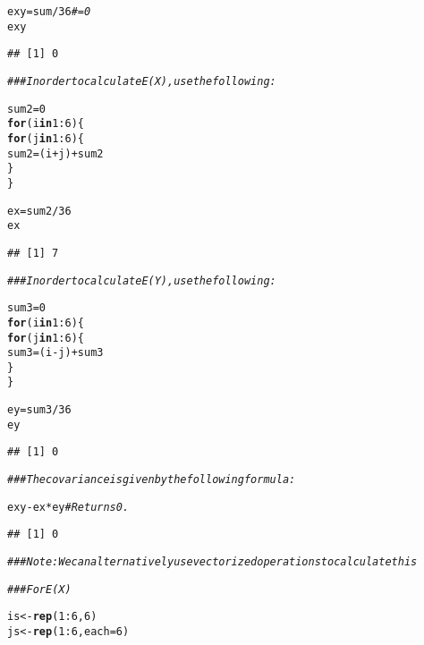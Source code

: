 \documentclass[12pt,letter]{article}\usepackage[]{graphicx}\usepackage[]{color}
\makeatletter
\newcommand{\hlnum}[1]{\textcolor[rgb]{0.686,0.059,0.569}{#1}}%
\newcommand{\hlcom}[1]{\textcolor[rgb]{0.678,0.584,0.686}{\textit{#1}}}%
\newcommand{\hlopt}[1]{\textcolor[rgb]{0,0,0}{#1}}%
\newcommand{\hlstd}[1]{\textcolor[rgb]{0.345,0.345,0.345}{#1}}%
\newcommand{\hlkwa}[1]{\textcolor[rgb]{0.161,0.373,0.58}{\textbf{#1}}}%
\newcommand{\hlkwb}[1]{\textcolor[rgb]{0.69,0.353,0.396}{#1}}%
\newcommand{\hlkwc}[1]{\textcolor[rgb]{0.333,0.667,0.333}{#1}}%
\newcommand{\hlkwd}[1]{\textcolor[rgb]{0.737,0.353,0.396}{\textbf{#1}}}%
\newenvironment{kframe}{%
 \def\at@end@of@kframe{}%
 \ifinner\ifhmode%
  \def\at@end@of@kframe{\end{minipage}}%
  \begin{minipage}{\columnwidth}%
 \fi\fi%
 \def\FrameCommand##1{\hskip\@totalleftmargin \hskip-\fboxsep
 \colorbox{shadecolor}{##1}\hskip-\fboxsep
     \hskip-\linewidth \hskip-\@totalleftmargin \hskip\columnwidth}%
 \MakeFramed {\advance\hsize-\width
   \@totalleftmargin\z@ \linewidth\hsize
   \@setminipage}}%
 {\par\unskip\endMakeFramed%
 \at@end@of@kframe}
\newenvironment{knitrout}{}{} %
\makeatother
\begin{document}
\begin{knitrout}
\color{fgcolor}\begin{kframe}
\begin{alltt}
\hlstd{exy} \hlkwb{=} \hlstd{sum}\hlopt{/}\hlnum{36}  \hlcom{# = 0 }
\hlstd{exy}
\end{alltt}
\begin{verbatim}
## [1] 0
\end{verbatim}
\begin{alltt}
\hlcom{### In order to calculate E(X), use the following:}

\hlstd{sum2} \hlkwb{=} \hlnum{0}
\hlkwa{for} \hlstd{(i} \hlkwa{in} \hlnum{1}\hlopt{:}\hlnum{6}\hlstd{) \{}
    \hlkwa{for} \hlstd{(j} \hlkwa{in} \hlnum{1}\hlopt{:}\hlnum{6}\hlstd{) \{}
        \hlstd{sum2} \hlkwb{=} \hlstd{(i} \hlopt{+} \hlstd{j)} \hlopt{+} \hlstd{sum2}
    \hlstd{\}}
\hlstd{\}}

\hlstd{ex} \hlkwb{=} \hlstd{sum2}\hlopt{/}\hlnum{36}
\hlstd{ex}
\end{alltt}
\begin{verbatim}
## [1] 7
\end{verbatim}
\begin{alltt}
\hlcom{### In order to calculate E(Y), use the following:}

\hlstd{sum3} \hlkwb{=} \hlnum{0}
\hlkwa{for} \hlstd{(i} \hlkwa{in} \hlnum{1}\hlopt{:}\hlnum{6}\hlstd{) \{}
    \hlkwa{for} \hlstd{(j} \hlkwa{in} \hlnum{1}\hlopt{:}\hlnum{6}\hlstd{) \{}
        \hlstd{sum3} \hlkwb{=} \hlstd{(i} \hlopt{-} \hlstd{j)} \hlopt{+} \hlstd{sum3}
    \hlstd{\}}
\hlstd{\}}

\hlstd{ey} \hlkwb{=} \hlstd{sum3}\hlopt{/}\hlnum{36}
\hlstd{ey}
\end{alltt}
\begin{verbatim}
## [1] 0
\end{verbatim}
\begin{alltt}
\hlcom{### The covariance is given by the following formula:}

\hlstd{exy} \hlopt{-} \hlstd{ex} \hlopt{*} \hlstd{ey}  \hlcom{# Returns 0.}
\end{alltt}
\begin{verbatim}
## [1] 0
\end{verbatim}
\begin{alltt}
\hlcom{### Note: We can alternatively use vectorized operations to calculate this}

\hlcom{### For E(X)}

\hlstd{is} \hlkwb{<-} \hlkwd{rep}\hlstd{(}\hlnum{1}\hlopt{:}\hlnum{6}\hlstd{,} \hlnum{6}\hlstd{)}
\hlstd{js} \hlkwb{<-} \hlkwd{rep}\hlstd{(}\hlnum{1}\hlopt{:}\hlnum{6}\hlstd{,} \hlkwc{each} \hlstd{=} \hlnum{6}\hlstd{)}


\end{alltt}
\end{kframe}
\end{knitrout}
\end{document}
